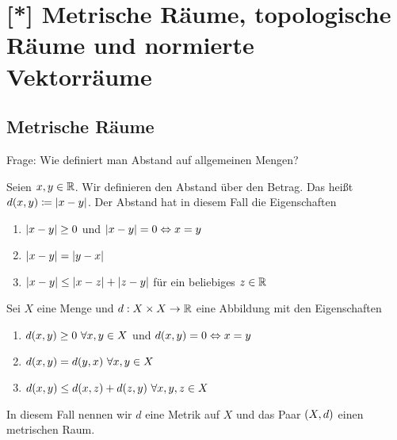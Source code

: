 \section{[*] Metrische Räume, topologische Räume und normierte Vektorräume}

\subsection{Metrische Räume}
\thispagestyle{pagenumberonly}

\marginnote{[07. Jun]}
Frage: Wie definiert man Abstand auf allgemeinen Mengen?

\begin{beispiel}
    Seien $x,y\in\mathbb{R}$. Wir definieren den Abstand über den Betrag. Das heißt $d\of{x,y}\coloneqq \abs{x-y}$.
    Der Abstand hat in diesem Fall die Eigenschaften
    \begin{enumerate}[label=(\roman*)]
        \item $\left\lvert x-y\right\rvert \geq 0$ und $\left\lvert x-y\right\rvert = 0 \Leftrightarrow{} x=y$
        \item $\left\lvert x-y\right\rvert = \left\lvert y-x\right\rvert$
        \item $\left\lvert x-y\right\rvert \leq \left\lvert x-z\right\rvert + \left\lvert z-y\right\rvert$ für ein beliebiges $z\in\mathbb{R}$
    \end{enumerate}
\end{beispiel}

\begin{definition}[Metrik]
    Sei $X$ eine Menge und $d: X \times X\rightarrow{} \mathbb{R}$ eine Abbildung mit den Eigenschaften
    \begin{enumerate}[label=(\roman*)]
        \item $d\of{x,y} \geq 0~\forall x,y\in X$ und $d\of{x,y} = 0\equivalent x = y$
        \item $d\of{x,y} = d\of{y,x}~\forall x,y\in X$
        \item $d\of{x,y} \leq d\of{x,z} + d\of{z,y}~\forall x,y,z\in X$
    \end{enumerate}
    In diesem Fall nennen wir $d$ eine Metrik auf $X$ und das Paar $\left(X, d\right)$ einen metrischen Raum.
\end{definition}

